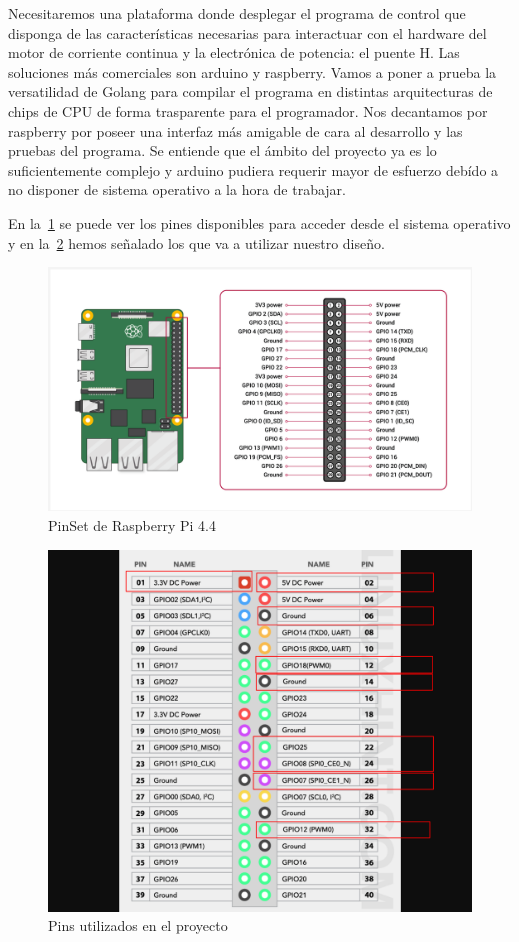 
Necesitaremos una plataforma donde desplegar el programa de control que disponga de las características necesarias para interactuar con el hardware del  motor de corriente continua y la electrónica de potencia: el puente H. Las soluciones más comerciales son arduino y raspberry. Vamos a poner a prueba la versatilidad de Golang para compilar el programa en distintas arquitecturas de chips de CPU de forma trasparente para el programador. Nos decantamos por raspberry por poseer una interfaz más amigable de cara al desarrollo y las pruebas del programa. Se entiende que el ámbito del proyecto ya es lo suficientemente complejo y arduino pudiera requerir mayor de esfuerzo debído a no disponer de sistema operativo a la hora de trabajar.

En la~\cref{fig:raspberry pins} se puede ver los pines disponibles para acceder desde el sistema operativo y en la~\cref{fig:Used Pins} hemos señalado los que va a utilizar nuestro diseño.

\begin{figure}[H]
    \centering
    \includegraphics[scale = 0.4]{part/Proyecto_ejecutivo/memoria_constructiva/raspb/img/raspberry}
    \caption{PinSet de Raspberry Pi 4.4\cite{raspberryORG} }\label{fig:raspberry pins}
\end{figure}

\begin{figure}[H]
    \centering
    \includegraphics[scale = 0.4]{part/Proyecto_ejecutivo/memoria_constructiva/raspb/img/gpio-pinout-raspberry-pi-01-used}
    \caption{Pins utilizados en el proyecto}\label{fig:Used Pins}
\end{figure}